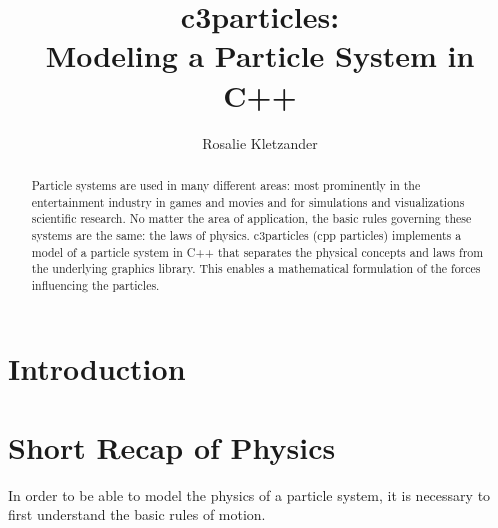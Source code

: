\documentclass[runningheads,a4paper]{llncs}
\begin{document}
\mainmatter  %

\title{c3particles: \\ Modeling a Particle System in C++}


%
\author{Rosalie Kletzander}
%


\maketitle


\begin{abstract}
Particle systems are used in many different areas: most prominently in the entertainment industry in games and movies and for simulations and visualizations scientific research. No matter the area of application, the basic rules governing these systems are the same: the laws of physics. c3particles (cpp particles) implements a model of a particle system in C++ that separates the physical concepts and laws from the underlying graphics library. This enables a mathematical formulation of the forces influencing the particles.

\end{abstract}

\section{Introduction}



\section{Short Recap of Physics}

In order to be able to model the physics of a particle system, it is necessary to first understand the basic rules of motion.
\end{document}
